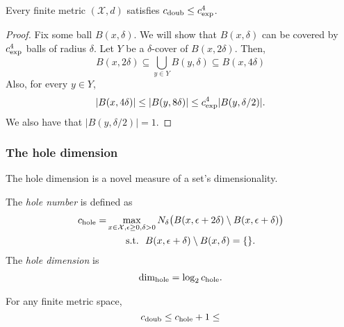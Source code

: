 \documentclass[../main.tex]{subfiles}
\newcommand{\set}[1]{\mathcal {#1}}
\newcommand{\krdim}{\text{dim}_\textnormal{exp}}
\newcommand{\doubdim}{\text{dim}_\textnormal{doub}}
\newcommand{\holedim}{\text{dim}_{\textnormal{hole}}}
\newcommand{\cexp}{c_\textnormal{exp}}
\newcommand{\cdoub}{c_\textnormal{doub}}
\newcommand{\chole}{c_\textnormal{hole}}
\begin{document}
\begin{lemma}
    Every finite metric $(\set X,d)$ satisfies
    $\cdoub \le \cexp^4$.
\end{lemma}
\begin{proof}
    Fix some ball $B(x,\delta)$.
    We will show that $B(x,\delta)$ can be covered by $\cexp^4$ balls of radius $\delta$.
    Let $Y$ be a $\delta$-cover of $B(x,2\delta)$.
    Then,
    \begin{equation}
        B(x,2\delta) 
        \subseteq 
        \bigcup\limits_{y\in Y} B(y,\delta) 
        \subseteq
        B(x,4\delta)
    \end{equation}
    Also, for every $y\in Y$,
    \begin{equation}
        |B(x,4\delta)| 
        \le 
        |B(y,8\delta)| 
        \le 
        \cexp^4 |B(y,\delta/2)|
        .
    \end{equation}
    We also have that $|B(y,\delta/2)|=1$.
\end{proof}


\subsubsection{The hole dimension}

The hole dimension is a novel measure of a set's dimensionality.

The \emph{hole number} is defined as
\begin{align}
    \chole
    = 
    &\max_{x\in\set X, \epsilon \ge 0, \delta > 0} 
    N_\delta\big( B(x,\epsilon+2\delta) \setminus B(x,\epsilon+\delta) \big)
    \\
    &
    ~~~~~~\text{s.t.}
    ~~
    B(x,\epsilon+\delta) \setminus B(x,\delta) = \{\}
    .
\end{align}
The \emph{hole dimension} is
\begin{align}
    \holedim = \log_2 \chole
    .
\end{align}

\begin{lemma}
    For any finite metric space,
    \begin{equation}
        \cdoub \le \chole + 1 \le 
    \end{equation}
\end{lemma}
\end{document}
